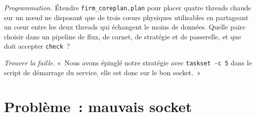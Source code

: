\begin{exercise}[$\star\star\star$]\label{exo:ll:multi-socket-machines-and-interconnects:7}
\emph{Programmation.} Étendre \texttt{firm\_coreplan.plan} pour placer quatre threads chauds sur un nœud ne disposant que de trois cœurs physiques utilisables
en partageant un cœur entre les deux threads qui échangent le moins de données. Quelle paire choisir dans un pipeline de flux, de carnet,
de stratégie et de passerelle, et que doit accepter \texttt{check}~?
\end{exercise}

\begin{exercise}[$\star\star\star$]\label{exo:ll:multi-socket-machines-and-interconnects:8}
\emph{Trouver la faille.} «~Nous avons épinglé notre stratégie avec \texttt{taskset -c 5} dans le script de démarrage du service, elle est
donc sur le bon socket.~»
\end{exercise}

\section{Problème~: mauvais socket}

